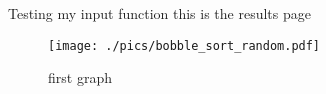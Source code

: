 
Testing my input function this is the results page
\begin{figure}
\centering
\texttt{[image: ./pics/bobble\_sort\_random.pdf]}
\caption{first graph}
\end{figure}